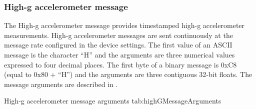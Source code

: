 \begingroup
    \def\tempNameA{Quaternion W element}
    \def\tempNameB{Quaternion X element}
    \def\tempNameC{Quaternion Y element}
    \def\tempNameD{Quaternion Z element}
    \def\tempNameE{Earth acceleration X axis}
    \def\tempNameF{Earth acceleration Y axis}
    \def\tempNameG{Earth acceleration Z axis}
    \def\tempValueA{1}
    \def\tempValueB{0}
    \def\tempValueC{0}
    \def\tempValueD{0}
    \def\tempValueE{0}
    \def\tempValueF{0}
    \def\tempValueG{0}
    \def\tempAsciiFirst{E}
    \def\tempAsciiA{1.0000}
    \def\tempAsciiB{0.0000}
    \def\tempAsciiC{0.0000}
    \def\tempAsciiD{0.0000}
    \def\tempAsciiE{0.0000}
    \def\tempAsciiF{0.0000}
    \def\tempAsciiG{0.0000}
    \def\tempBinaryFirst{C5}
    \def\tempBinaryA{00 00 80 3F}
    \def\tempBinaryB{00 00 00 00}
    \def\tempBinaryC{00 00 00 00}
    \def\tempBinaryD{00 00 00 00}
    \def\tempBinaryE{00 00 00 00}
    \def\tempBinaryF{00 00 00 00}
    \def\tempBinaryG{00 00 00 00}
    \dataMessageExample
\endgroup

\subsubsection{High-g accelerometer message}

The High-g accelerometer message provides timestamped high-g accelerometer measurements.  High-g accelerometer messages are sent continuously at the message rate configured in the device settings.  The first value of an \ac{ASCII} message is the character \enquote{H} and the arguments are three numerical values expressed to four decimal places.  The first byte of a binary message is 0xC8 (equal to 0x80 + \enquote{H}) and the arguments are three contiguous 32-bit floats.  The message arguments are described in .

\begingroup
    \def\tempArgumentA{High-g accelerometer X axis in g}
    \def\tempArgumentB{High-g accelerometer Y axis in g}
    \def\tempArgumentC{High-g accelerometer Z axis in g}
    \dataMessageTable
    {High-g accelerometer message arguments}
    {tab:highGMessageArguments}
\endgroup

\begingroup
    \def\tempNameA{High-g accelerometer X axis}
    \def\tempNameB{High-g accelerometer Y axis}
    \def\tempNameC{High-g accelerometer Z axis}
    \def\tempValueA{0}
    \def\tempValueB{0}
    \def\tempValueC{1}
    \def\tempAsciiFirst{H}
    \def\tempAsciiA{0.0000}
    \def\tempAsciiB{0.0000}
    \def\tempAsciiC{1.0000}
    \def\tempBinaryFirst{C8}
    \def\tempBinaryA{00 00 00 00}
    \def\tempBinaryB{00 00 00 00}
    \def\tempBinaryC{00 00 80 3F}
    \dataMessageExample
\endgroup

